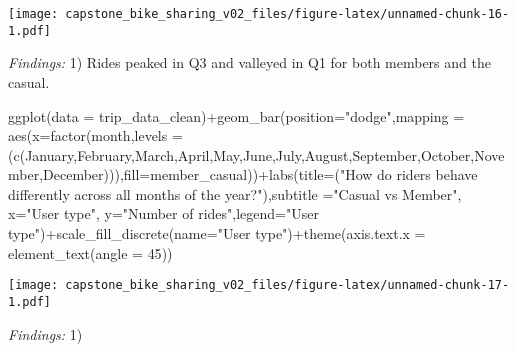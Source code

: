 \documentclass[
]{article}
\newenvironment{Shaded}{\begin{snugshade}}{\end{snugshade}}
\newcommand{\AttributeTok}[1]{\textcolor[rgb]{0.77,0.63,0.00}{#1}}
\newcommand{\DecValTok}[1]{\textcolor[rgb]{0.00,0.00,0.81}{#1}}
\newcommand{\FunctionTok}[1]{\textcolor[rgb]{0.00,0.00,0.00}{#1}}
\newcommand{\NormalTok}[1]{#1}
\newcommand{\SpecialCharTok}[1]{\textcolor[rgb]{0.00,0.00,0.00}{#1}}
\newcommand{\StringTok}[1]{\textcolor[rgb]{0.31,0.60,0.02}{#1}}
\begin{document}
\texttt{[image: capstone\_bike\_sharing\_v02\_files/figure-latex/unnamed-chunk-16-1.pdf]}

\emph{Findings:} 1) Rides peaked in Q3 and valleyed in Q1 for both
members and the casual.

\begin{Shaded}
\begin{Highlighting}[]
\FunctionTok{ggplot}\NormalTok{(}\AttributeTok{data =}\NormalTok{ trip\_data\_clean)}\SpecialCharTok{+}\FunctionTok{geom\_bar}\NormalTok{(}\AttributeTok{position=}\StringTok{"dodge"}\NormalTok{,}\AttributeTok{mapping =} \FunctionTok{aes}\NormalTok{(}\AttributeTok{x=}\FunctionTok{factor}\NormalTok{(month,}\AttributeTok{levels =}\NormalTok{ (}\FunctionTok{c}\NormalTok{(}\StringTok{\textquotesingle{}January\textquotesingle{}}\NormalTok{,}\StringTok{\textquotesingle{}February\textquotesingle{}}\NormalTok{,}\StringTok{\textquotesingle{}March\textquotesingle{}}\NormalTok{,}\StringTok{\textquotesingle{}April\textquotesingle{}}\NormalTok{,}\StringTok{\textquotesingle{}May\textquotesingle{}}\NormalTok{,}\StringTok{\textquotesingle{}June\textquotesingle{}}\NormalTok{,}\StringTok{\textquotesingle{}July\textquotesingle{}}\NormalTok{,}\StringTok{\textquotesingle{}August\textquotesingle{}}\NormalTok{,}\StringTok{\textquotesingle{}September\textquotesingle{}}\NormalTok{,}\StringTok{\textquotesingle{}October\textquotesingle{}}\NormalTok{,}\StringTok{\textquotesingle{}November\textquotesingle{}}\NormalTok{,}\StringTok{\textquotesingle{}December\textquotesingle{}}\NormalTok{))),}\AttributeTok{fill=}\NormalTok{member\_casual))}\SpecialCharTok{+}\FunctionTok{labs}\NormalTok{(}\AttributeTok{title=}\NormalTok{(}\StringTok{"How do riders behave differently across all months of the year?"}\NormalTok{),}\AttributeTok{subtitle =}\StringTok{"Casual vs Member"}\NormalTok{, }\AttributeTok{x=}\StringTok{"User type"}\NormalTok{, }\AttributeTok{y=}\StringTok{"Number of rides"}\NormalTok{,}\AttributeTok{legend=}\StringTok{"User type"}\NormalTok{)}\SpecialCharTok{+}\FunctionTok{scale\_fill\_discrete}\NormalTok{(}\AttributeTok{name=}\StringTok{"User type"}\NormalTok{)}\SpecialCharTok{+}\FunctionTok{theme}\NormalTok{(}\AttributeTok{axis.text.x =} \FunctionTok{element\_text}\NormalTok{(}\AttributeTok{angle =} \DecValTok{45}\NormalTok{))}
\end{Highlighting}
\end{Shaded}

\texttt{[image: capstone\_bike\_sharing\_v02\_files/figure-latex/unnamed-chunk-17-1.pdf]}

\emph{Findings:} 1)
\end{document}
